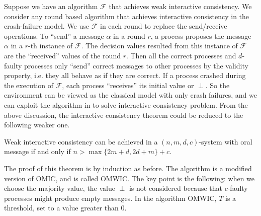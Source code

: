 Suppose we have an algorithm $\mathcal{F}$ that achieves weak interactive
consistency. 
We consider any round based algorithm that achieves interactive consistency in the crash-failure model.
We use $\mathcal{F}$ in each round to replace the send/receive operations.
 To ``send'' a message $\alpha$ in a round $r$, a process proposes the message $\alpha$ in a $r$-th instance of 
 $\mathcal{F}$.
The decision values resulted from this instance of $\mathcal{F}$ are  the ``received'' values of the round $r$.
Then all the correct
processes and $d$-faulty processes only ``send'' correct messages to other
processes by the validity property, i.e. they all  behave as if they are
correct. 
If a process crashed during the execution of $\mathcal{F}$, 
each process 
``receives'' its initial value or $\perp$. 
So the environment can be viewed as the classical
model with only crash failures, and we can exploit the algorithm in \cite{lamport1982crash,dolev1982polynomial,dwork1990knowledge} to
solve interactive consistency problem. From the above discussion, the
interactive consistency theorem could be reduced to the following weaker one.

\begin{theorem}\label{weakThm}
  Weak interactive consistency can be achieved in a $( n,m,d,c )$-system with
  oral message if and only if $n> \max \{ 2m+d,2d+m \} +c$.
\end{theorem}

The proof of this theorem is by induction as before. The algorithm is
a modified version of OMIC, and is called OMWIC. The key point is the following: when we
choose the majority value, the value $\perp$ is not considered because that
$c$-faulty processes might produce  empty messages. In the
algorithm OMWIC, $T$ is a threshold, set to a value greater than $0$.

